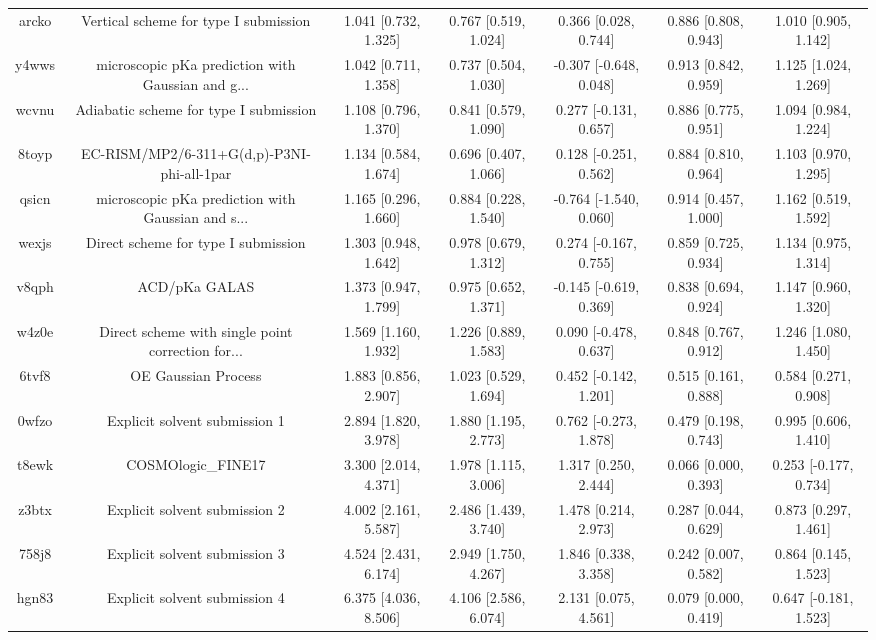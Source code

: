 \documentclass{article}
\begin{document}
\begin{center}
\begin{longtable}{|ccccccc|}
 arcko &              Vertical scheme for type I submission &  1.041 [0.732, 1.325] &  0.767 [0.519, 1.024] &     0.366 [0.028, 0.744] &  0.886 [0.808, 0.943] &   1.010 [0.905, 1.142] \\
 y4wws &  microscopic pKa prediction with Gaussian and g... &  1.042 [0.711, 1.358] &  0.737 [0.504, 1.030] &   -0.307 [-0.648, 0.048] &  0.913 [0.842, 0.959] &   1.125 [1.024, 1.269] \\
 wcvnu &             Adiabatic scheme for type I submission &  1.108 [0.796, 1.370] &  0.841 [0.579, 1.090] &    0.277 [-0.131, 0.657] &  0.886 [0.775, 0.951] &   1.094 [0.984, 1.224] \\
 8toyp &         EC-RISM/MP2/6-311+G(d,p)-P3NI-phi-all-1par &  1.134 [0.584, 1.674] &  0.696 [0.407, 1.066] &    0.128 [-0.251, 0.562] &  0.884 [0.810, 0.964] &   1.103 [0.970, 1.295] \\
 qsicn &  microscopic pKa prediction with Gaussian and s... &  1.165 [0.296, 1.660] &  0.884 [0.228, 1.540] &   -0.764 [-1.540, 0.060] &  0.914 [0.457, 1.000] &   1.162 [0.519, 1.592] \\
 wexjs &                Direct scheme for type I submission &  1.303 [0.948, 1.642] &  0.978 [0.679, 1.312] &    0.274 [-0.167, 0.755] &  0.859 [0.725, 0.934] &   1.134 [0.975, 1.314] \\
 v8qph &                                      ACD/pKa GALAS &  1.373 [0.947, 1.799] &  0.975 [0.652, 1.371] &   -0.145 [-0.619, 0.369] &  0.838 [0.694, 0.924] &   1.147 [0.960, 1.320] \\
 w4z0e &  Direct scheme with single point correction for... &  1.569 [1.160, 1.932] &  1.226 [0.889, 1.583] &    0.090 [-0.478, 0.637] &  0.848 [0.767, 0.912] &   1.246 [1.080, 1.450] \\
 6tvf8 &                                OE Gaussian Process &  1.883 [0.856, 2.907] &  1.023 [0.529, 1.694] &    0.452 [-0.142, 1.201] &  0.515 [0.161, 0.888] &   0.584 [0.271, 0.908] \\
 0wfzo &                      Explicit solvent submission 1 &  2.894 [1.820, 3.978] &  1.880 [1.195, 2.773] &    0.762 [-0.273, 1.878] &  0.479 [0.198, 0.743] &   0.995 [0.606, 1.410] \\
 t8ewk &                                 COSMOlogic\_FINE17 &  3.300 [2.014, 4.371] &  1.978 [1.115, 3.006] &     1.317 [0.250, 2.444] &  0.066 [0.000, 0.393] &  0.253 [-0.177, 0.734] \\
 z3btx &                      Explicit solvent submission 2 &  4.002 [2.161, 5.587] &  2.486 [1.439, 3.740] &     1.478 [0.214, 2.973] &  0.287 [0.044, 0.629] &   0.873 [0.297, 1.461] \\
 758j8 &                      Explicit solvent submission 3 &  4.524 [2.431, 6.174] &  2.949 [1.750, 4.267] &     1.846 [0.338, 3.358] &  0.242 [0.007, 0.582] &   0.864 [0.145, 1.523] \\
 hgn83 &                      Explicit solvent submission 4 &  6.375 [4.036, 8.506] &  4.106 [2.586, 6.074] &     2.131 [0.075, 4.561] &  0.079 [0.000, 0.419] &  0.647 [-0.181, 1.523] \\
\end{longtable}
\end{center}
\end{document}
